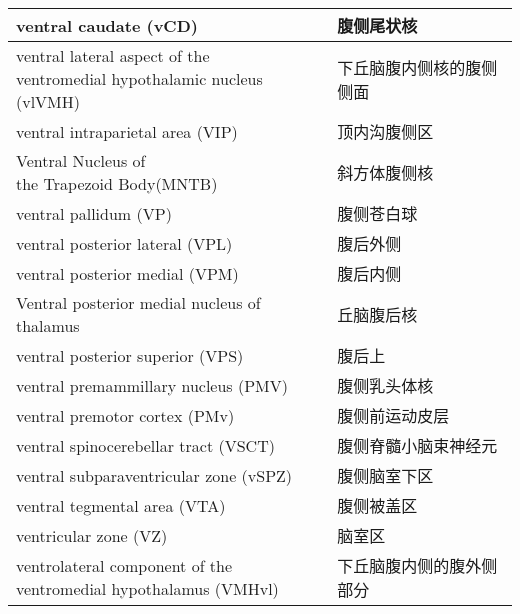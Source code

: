 \begin{longtable}{lll}
	\midrule
	ventral caudate (vCD)   && 腹侧尾状核  \\
	
	\midrule
	\makecell[l]{ventral lateral aspect of the \\ventromedial hypothalamic nucleus (vlVMH)}   && 下丘脑腹内侧核的腹侧侧面  \\
	
	\midrule
	ventral intraparietal area (VIP)   && 顶内沟腹侧区  \\
	
	\midrule
	\makecell[l]{Ventral Nucleus of \\the Trapezoid Body(MNTB)}   && 斜方体腹侧核  \\
	
	\midrule
	ventral pallidum (VP)  && 腹侧苍白球  \\
	
	\midrule
	ventral posterior lateral (VPL)   && 腹后外侧  \\
	
	\midrule
	ventral posterior medial (VPM)   && 腹后内侧  \\
	
	\midrule
	Ventral posterior medial nucleus of thalamus   && 丘脑腹后核  \\
	
	\midrule
	ventral posterior superior (VPS)   && 腹后上  \\
	
	\midrule
	ventral premammillary nucleus (PMV)  && 腹侧乳头体核  \\
	
	\midrule
	ventral premotor cortex (PMv)   && 腹侧前运动皮层  \\
	
	\midrule
	ventral spinocerebellar tract (VSCT)   && 腹侧脊髓小脑束神经元  \\
	
	\midrule
	ventral subparaventricular zone (vSPZ)  && 腹侧脑室下区  \\
	
	\midrule
	ventral tegmental area (VTA)   && 腹侧被盖区  \\
	
	\midrule
	ventricular zone (VZ)   && 脑室区  \\
	
	\midrule
	\makecell[l]{ventrolateral component of the \\ventromedial hypothalamus (VMHvl)}  && 下丘脑腹内侧的腹外侧部分  \\
	

\end{longtable}
